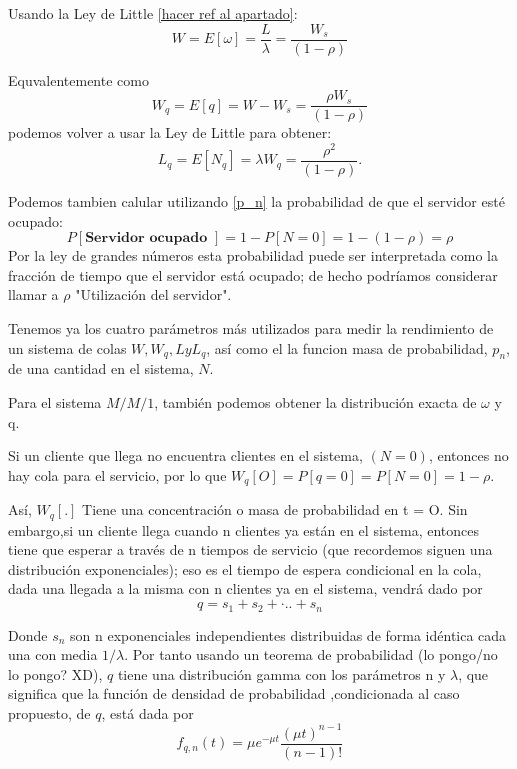 \documentclass[a4paper,10pt]{scrartcl}
\theoremstyle{definition}
\numberwithin{equation}{section}
\begin{document}
Usando la Ley de Little \ref{hacer ref al apartado}:
\begin{equation*}
  W=E[\omega]=\frac{L}{\lambda}=\frac{W_s}{(1-\rho)}
\end{equation*}

Equvalentemente como \[ W_q=E[q]=W-W_s=\frac{\rho W_s}{(1-\rho)} \] podemos volver a usar la Ley de Little 
para obtener:
\begin{equation*}
  L_q=E[N_q]=\lambda W_q=\frac{\rho^2}{(1-\rho)}.
\end{equation*}

Podemos tambien calular utilizando \ref{p_n} la probabilidad de que el servidor esté ocupado:
\begin{equation*}
  P[\textbf{Servidor ocupado }]=1-P[N=0]=1-(1-\rho)=\rho
\end{equation*}
Por la ley de grandes números esta probabilidad puede ser interpretada como la fracción de tiempo que el 
servidor está ocupado; de hecho podríamos considerar llamar a $\rho$ "Utilización del servidor".

Tenemos ya los cuatro parámetros más utilizados para medir la rendimiento de un sistema de colas 
$W, W_q, L y L_q$, así como el la funcion masa de probabilidad, $p_n$, de una cantidad en el sistema, $N$. 

Para el sistema $M / M / 1$, también podemos obtener la distribución exacta de $\omega$ y q.

Si un cliente que llega no encuentra clientes en el sistema, $(N = 0)$, entonces no hay cola para el 
servicio, por lo que $W_q [O] = P [q = 0] = P [N = 0] = 1 - \rho$.

Así, $W_q [.]$ Tiene una concentración o masa de probabilidad en t = O. 
Sin embargo,si un cliente llega cuando n clientes ya están en el sistema, entonces tiene que esperar a
través de n tiempos de servicio (que recordemos siguen una distribución exponenciales); eso es el tiempo
de espera condicional en la cola, dada una llegada a la misma con n clientes ya en el sistema, vendrá dado por
\[q = s_1 + s_2 + ·. . + s_n\]

Donde $s_n$ son n exponenciales independientes distribuidas de forma idéntica cada una con media $1 / \lambda$.  Por tanto usando un teorema de probabilidad (lo pongo/no lo pongo? XD), $q$ tiene una distribución gamma con los parámetros n y $\lambda$, que significa que la función de densidad de probabilidad ,condicionada al caso propuesto, de $q$, está dada por
\begin{equation*}
  f_{q,n}(t)=\mu e^{-\mu t} \frac{(\mu t)^{n-1}}{(n-1)!}
\end{equation*}
\end{document}
